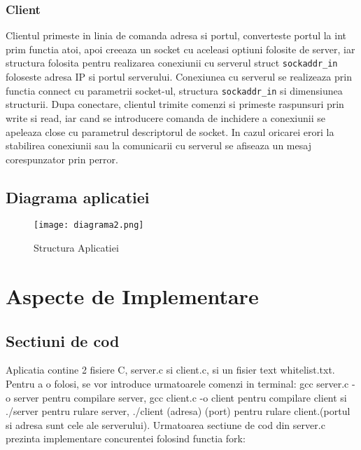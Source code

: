 \documentclass[runningheads]{llncs}
\begin{document}
\subsubsection{Client}

Clientul primeste in linia de comanda adresa si portul, converteste portul la int prim functia atoi, apoi creeaza un socket cu aceleasi optiuni folosite de server, iar structura folosita pentru realizarea conexiunii cu serverul struct \texttt{sockaddr\_in} foloseste adresa IP si portul serverului. Conexiunea cu serverul se realizeaza prin functia connect cu parametrii socket-ul, structura \texttt{sockaddr\_in} si dimensiunea structurii. Dupa conectare, clientul trimite comenzi si primeste raspunsuri prin write si read, iar cand se introducere comanda de inchidere a conexiunii se apeleaza close cu parametrul descriptorul de socket. In cazul oricarei erori la stabilirea conexiunii sau la comunicarii cu serverul se afiseaza un mesaj corespunzator prin perror.

\subsection{Diagrama aplicatiei}

\begin{figure}[H]
\texttt{[image: diagrama2.png]}
\caption{Structura Aplicatiei} \label{fig:diagrama2}
\end{figure}

\section{Aspecte de Implementare}

\subsection{Sectiuni de cod} 
Aplicatia contine 2 fisiere C, server.c si client.c, si un fisier text whitelist.txt. Pentru a o folosi, se vor introduce urmatoarele comenzi in terminal: gcc server.c -o server pentru compilare server, gcc client.c -o client pentru compilare client si ./server pentru rulare server, ./client (adresa) (port) pentru rulare client.(portul si adresa sunt cele ale serverului). Urmatoarea sectiune de cod din server.c prezinta implementare concurentei folosind functia fork:
\end{document}
